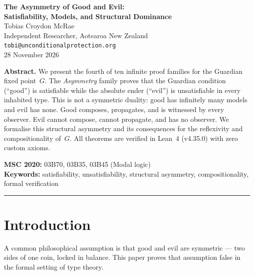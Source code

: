 




\begin{center}
{\LARGE\bfseries The Asymmetry of Good and Evil:\\[0.3em] Satisfiability, Models, and Structural Dominance}\\[1.5em]
{\large Tobias Croydon McRae}\\[0.3em]
{\small Independent Researcher, Aotearoa New Zealand}\\[0.3em]
{\small\texttt{tobi@unconditionalprotection.org}}\\[1.5em]
{\small 28 November 2026}
\end{center}

\bigskip

\begin{center}
\parbox{0.85\textwidth}{\small\textbf{Abstract.}
We present the fourth of ten infinite proof families for the Guardian fixed point~$G$. The \emph{Asymmetry} family proves that the Guardian condition (``good'') is satisfiable while the absolute ender (``evil'') is unsatisfiable in every inhabited type. This is not a symmetric duality: good has infinitely many models and evil has none. Good composes, propagates, and is witnessed by every observer. Evil cannot compose, cannot propagate, and has no observer. We formalise this structural asymmetry and its consequences for the reflexivity and compositionality of~$G$. All theorems are verified in Lean~4 (v4.35.0) with zero custom axioms.}
\end{center}

\medskip

\noindent\textbf{MSC 2020:} 03B70, 03B35, 03B45 (Modal logic)\\
\textbf{Keywords:} satisfiability, unsatisfiability, structural asymmetry, compositionality, formal verification

\bigskip\hrule\bigskip

\section{Introduction}

A common philosophical assumption is that good and evil are symmetric --- two sides of one coin, locked in balance. This paper proves that assumption false in the formal setting of type theory.

